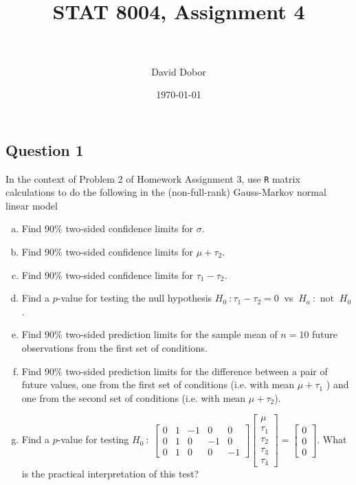 \documentclass[paper=a4, fontsize=11pt]{scrartcl} %
\title{	
\normalfont \normalsize 
\horrule{0.5pt} \\[0.4cm] %
\huge STAT 8004, Assignment 4 \\ %
\horrule{2pt} \\[0.5cm] %
}
\author{David Dobor}
\date{\normalsize\today} %
\begin{document}
\maketitle 

\subsection*{Question 1}
In the context of Problem 2 of Homework Assignment 3, use \texttt{R} matrix 
calculations to do the following in the (non-full-rank) Gauss-Markov normal linear 
model


\begin{enumerate}[(a)]
\item Find 90\% two-sided confidence limits for $\sigma$.

\item Find 90\% two-sided confidence limits for $\mu + \tau_2$.

\item Find 90\% two-sided confidence limits for $\tau_1 -  \tau_2$.

\item Find a $p$-value for testing the null hypothesis $H_0 \ : \tau_1 -  \tau_2 = 0 \ $ vs $\ H_a \ : \text{ not } \ H_0$.

\item Find 90\% two-sided prediction limits for the sample mean of $ n = 10$ future observations from
the first set of conditions.

\item Find 90\% two-sided prediction limits for the difference between a pair of future values, one
from the first set of conditions (i.e. with mean  $\mu + \tau_1$ ) and one from the second set of conditions
(i.e. with mean  $\mu + \tau_2$).

\item Find a $p$-value for testing $H_0 \ : \ 
\begin{bmatrix} 0 & 1 & -1 & 0 & 0 \\
                             0 & 1 & 0 & -1 & 0 \\
                             0 & 1 & 0 & 0 & -1
\end{bmatrix}
\begin{bmatrix} \mu\\
                             \tau_1\\
                             \tau_2\\
                             \tau_3\\
                             \tau_4
\end{bmatrix}
=
\begin{bmatrix} 0\\
                             0\\
                             0
\end{bmatrix}
$. What is the practical interpretation of this test?


\end{enumerate}
\end{document}
